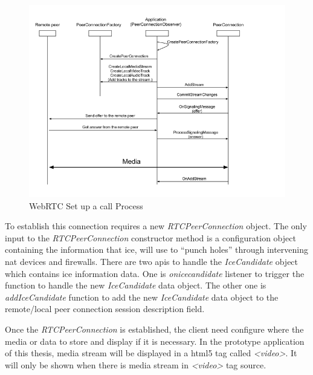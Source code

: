 
\begin{figure}
	\centering
    	\includegraphics[height=0.50\textheight,natwidth=610,natheight=642]{figs/webrtc_diagram.png}
  	\caption{WebRTC Set up a call Process}
  	\label{fig:webrtc_diagram}
\end{figure}

\par To establish this connection requires a new \textit{RTCPeerConnection} object. The only input to the \textit{RTCPeerConnection} constructor method is a configuration object containing the information that \gls{ice}, will use to “punch holes” through intervening \gls{nat} devices and firewalls. There are two \gls{api}s to handle the  \textit{IceCandidate} object which contains \gls{ice} information data. One is \textit{onicecandidate} listener to trigger the function to handle the new \textit{IceCandidate} data object. The other one is \textit{addIceCandidate} function to add the new \textit{IceCandidate} data object to the remote/local peer connection session description field.

\par Once the \textit{RTCPeerConnection} is established, the client need configure where the media or data to store and display if it is necessary. In the prototype application of this thesis, media stream will be displayed in a \gls{html5} tag called \textit{<video>}. It will only be shown when there is media stream in \textit{<video>} tag source.

